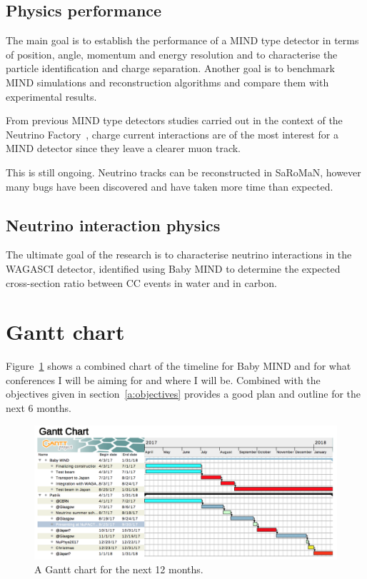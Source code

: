 \subsection{Physics performance}
The main goal is to establish the performance of a MIND type detector in terms of position, angle, momentum and energy resolution and to characterise the particle identification and charge separation. 
Another goal is to benchmark MIND simulations and reconstruction algorithms and compare them with experimental results.

From previous MIND type detectors studies carried out in the context of the Neutrino Factory~\cite{25NUfact}, charge current interactions are of the most interest for a MIND detector since they leave a clearer muon track.

This is still ongoing. Neutrino tracks can be reconstructed in SaRoMaN, however many bugs have been discovered and have taken more time than expected.

\subsection{Neutrino interaction physics}
The ultimate goal of the research is to characterise neutrino interactions in the WAGASCI detector, identified using Baby MIND to determine the expected cross-section ratio between CC events in water and in carbon. 


\section{Gantt chart}

Figure~\ref{fig:Gantt} shows a combined chart of the timeline for Baby MIND and for what conferences I will be aiming for and where I will be. Combined with the objectives given in section~\ref{a:objectives} provides a good plan and outline for the next 6 months.

\begin{figure}[h!]
\centering
\includegraphics[width=\textwidth]{figures/Gantt.png}
\caption{A Gantt chart for the next 12 months.}
\label{fig:Gantt}
\end{figure}




